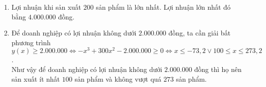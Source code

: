 \begin{ex}
{\begin{enumerate}
	\item Lợi nhuận khi sản xuất $200$ sản phẩm là lớn nhất. Lợi nhuận lớn nhất đó bằng $4.000.000$ đồng.
	\item Để doanh nghiệp có lợi nhuận không dưới $2.000.000$ đồng, ta cần giải bất phương trình
	$y(x)\geq 2.000.000 \Leftrightarrow -x^3 + 300x^2 - 2.000.000 \geq 0 \Leftrightarrow x \leq -73{,}2 \vee 100\leq x \leq 273{,}2$.\\
	Như vậy để doanh nghiệp có lợi nhuận không dưới $2.000.000$ đồng thì họ nên sản xuất ít nhất $100$ sản phẩm và không vượt quá $273$ sản phẩm.
	\end{enumerate}
	}
\end{ex}


